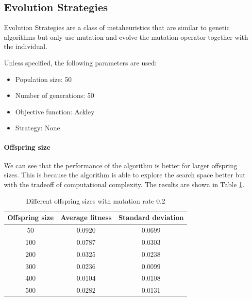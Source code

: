 \subsection{Evolution Strategies}
Evolution Strategies are a class of metaheuristics that are similar to genetic algorithms but only use mutation and evolve the mutation operator together with the individual.

Unless specified, the following parameters are used:
\begin{itemize}
    \item Population size: 50
    \item Number of generations: 50
    \item Objective function: Ackley
    \item Strategy: None
\end{itemize}

\paragraph*{Offspring size}
We can see that the performance of the algorithm is better for larger offspring sizes. This is because the algorithm is able to explore the search space better but with the tradeoff of computational complexity. The results are shown in Table \ref{tab:es-offspring_size}.
\begin{table}
    \centering
    \begin{tabular}{|c|c|c|}
        Offspring size & Average fitness & Standard deviation \\ \hline
        50             & 0.0920          & 0.0699             \\
        100            & 0.0787          & 0.0303             \\
        200            & 0.0325          & 0.0238             \\
        300            & 0.0236          & 0.0099             \\
        400            & 0.0104          & 0.0108             \\
        500            & 0.0282          & 0.0131             \\
    \end{tabular}
    \caption{Different offspring sizes with mutation rate 0.2}
    \label{tab:es-offspring_size}
\end{table}

